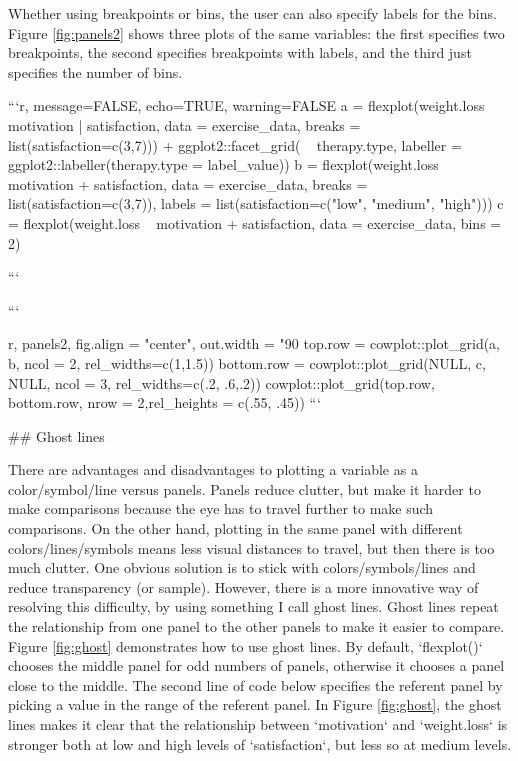 {{{{{{{{{{Whether using breakpoints or bins, the user can also specify labels for the bins. Figure \ref{fig:panels2} shows three plots of the same variables: the first specifies two breakpoints, the second specifies breakpoints with labels, and the third just specifies the number of bins. 

```{r, message=FALSE, echo=TRUE, warning=FALSE}
a = flexplot(weight.loss ~ motivation | satisfaction, 
             data = exercise_data, 
             breaks = list(satisfaction=c(3,7))) +
  ggplot2::facet_grid( ~ therapy.type, 
              labeller = ggplot2::labeller(therapy.type = label_value))
b = flexplot(weight.loss ~ motivation + satisfaction, 
             data = exercise_data, 
             breaks = list(satisfaction=c(3,7)), 
             labels = list(satisfaction=c("low", "medium", "high")))
c = flexplot(weight.loss ~ motivation + satisfaction, 
             data = exercise_data, 
             bins = 2) 

```

```{r, panels2, fig.align = "center", out.width = "90%
  top.row = cowplot::plot_grid(a, b, ncol = 2, rel_widths=c(1,1.5))
  bottom.row = cowplot::plot_grid(NULL, c, NULL, ncol = 3, rel_widths=c(.2, .6,.2))
  cowplot::plot_grid(top.row, bottom.row, nrow = 2,rel_heights = c(.55, .45))
```


## Ghost lines

There are advantages and disadvantages to plotting a variable as a color/symbol/line versus panels. Panels reduce clutter, but make it harder to make comparisons because the eye has to travel further to make such comparisons. On the other hand, plotting in the same panel with different colors/lines/symbols means less visual distances to travel, but then there is too much clutter. One obvious solution is to stick with colors/symbols/lines and reduce transparency (or sample). However, there is a more innovative way of resolving this difficulty, by using something I call ghost lines. Ghost lines repeat the relationship from one panel to the other panels to make it easier to compare. Figure \ref{fig:ghost} demonstrates how to use ghost lines. By default, `flexplot()` chooses the middle panel for odd numbers of panels, otherwise it chooses a panel close to the middle. The second line of code below specifies the referent panel by picking a value in the range of the referent panel. In Figure \ref{fig:ghost}, the ghost lines makes it clear that the relationship between `motivation` and `weight.loss` is stronger both at low and high levels of `satisfaction`, but less so at medium levels. 

}}}}}}}}}}}
